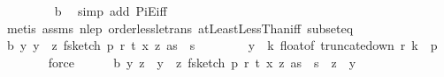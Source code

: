 \begin{isabellebody}
\ \ \ \ \ \ \ \isamarkupfalse%
\ b{\isacharunderscore}{\kern0pt}{}\ \isamarkupfalse%
\ {\isacharparenleft}{\kern0pt}simp\ add{\isacharcolon}{\kern0pt}\ PiE{\isacharunderscore}{\kern0pt}iff{\isacharparenright}{\kern0pt}\isanewline
\ \ \ \ \ \ \isamarkupfalse%
\ {\isacharparenleft}{\kern0pt}metis\ assms{\isacharparenleft}{\kern0pt}{}{\isacharparenright}{\kern0pt}\ n{\isacharunderscore}{\kern0pt}le{\isacharunderscore}{\kern0pt}p\ order{\isacharunderscore}{\kern0pt}less{\isacharunderscore}{\kern0pt}le{\isacharunderscore}{\kern0pt}trans\ atLeastLessThan{\isacharunderscore}{\kern0pt}iff\ subset{\isacharunderscore}{\kern0pt}eq{\isacharparenright}{\kern0pt}\isanewline
\ \ \ \ \isamarkupfalse%
\ b{\isacharunderscore}{\kern0pt}{}{\isacharcolon}{\kern0pt}\ {\isachardoublequoteopen}{\isasymAnd}y{\isachardot}{\kern0pt}\ y\ {\isasymin}\ {\isacharparenleft}{\kern0pt}{\isasymlambda}z{\isachardot}{\kern0pt}\ f{}{\isacharunderscore}{\kern0pt}sketch\ p\ r\ t\ {\isacharparenleft}{\kern0pt}x\ z{\isacharparenright}{\kern0pt}\ as{\isacharparenright}{\kern0pt}\ {\isacharbackquote}{\kern0pt}\ {\isacharbraceleft}{\kern0pt}{}{\isachardot}{\kern0pt}{\isachardot}{\kern0pt}{\isacharless}{\kern0pt}s{\isacharbraceright}{\kern0pt}\ {\isasymLongrightarrow}\ \isanewline
\ \ \ \ \ \ y\ {\isasymsubseteq}\ {\isacharparenleft}{\kern0pt}{\isasymlambda}k{\isachardot}{\kern0pt}\ float{\isacharunderscore}{\kern0pt}of\ {\isacharparenleft}{\kern0pt}truncate{\isacharunderscore}{\kern0pt}down\ r\ k{\isacharparenright}{\kern0pt}{\isacharparenright}{\kern0pt}\ {\isacharbackquote}{\kern0pt}\ {\isacharbraceleft}{\kern0pt}{}{\isachardot}{\kern0pt}{\isachardot}{\kern0pt}{\isacharless}{\kern0pt}p{\isacharbraceright}{\kern0pt}{\isachardoublequoteclose}\isanewline
\ \ \ \ \ \ \isamarkupfalse%
\ force\isanewline
\isanewline
\ \ \ \ \isamarkupfalse%
\ b{\isacharunderscore}{\kern0pt}{}{\isacharunderscore}{\kern0pt}{}{\isacharcolon}{\kern0pt}\ {\isachardoublequoteopen}{\isasymAnd}y\ z\ {\isachardot}{\kern0pt}\ y\ {\isasymin}\ {\isacharparenleft}{\kern0pt}{\isasymlambda}z{\isachardot}{\kern0pt}\ f{}{\isacharunderscore}{\kern0pt}sketch\ p\ r\ t\ {\isacharparenleft}{\kern0pt}x\ z{\isacharparenright}{\kern0pt}\ as{\isacharparenright}{\kern0pt}\ {\isacharbackquote}{\kern0pt}\ {\isacharbraceleft}{\kern0pt}{}{\isachardot}{\kern0pt}{\isachardot}{\kern0pt}{\isacharless}{\kern0pt}s{\isacharbraceright}{\kern0pt}\ {\isasymLongrightarrow}\ z\ {\isasymin}\ y\ {\isasymLongrightarrow}\ \isanewline

\end{isabellebody}
